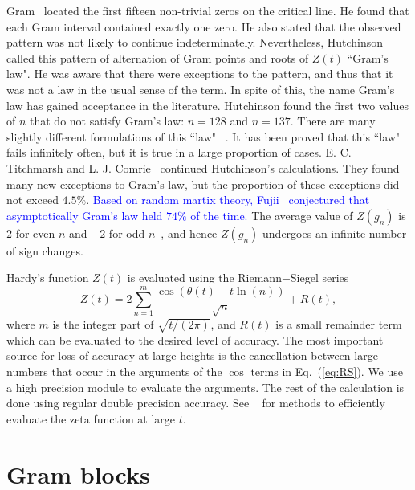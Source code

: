 \documentclass[twoside]{article}
\theoremstyle{definition}
\begin{document}
Gram~\cite{Gram 1903} located the first fifteen non-trivial zeros on the critical line. He found that each Gram interval 
contained exactly one zero. He also stated that the observed pattern was not likely to continue indeterminately. 
Nevertheless, Hutchinson~\cite{Hutchinson 1925} called this pattern of alternation of Gram points and roots of $Z(t)$ ``Gram's law". He was aware that there were exceptions to the pattern, and thus that it was not a law in the usual sense of the term. In spite of this, the name Gram's law has gained acceptance in the literature. Hutchinson found the first two values of $n$ that do not satisfy Gram's
law: $n = 128$ and $n = 137$.
There are many slightly different  formulations of this ``law" ~\cite{Korolev,Trudgian}.
It has been proved that this ``law" fails infinitely often, but it is true in a large proportion of cases. E. C. Titchmarsh and L. J. Comrie~\cite{Titchmarsh 1935,Titchmarsh 1936} continued Hutchinson's calculations. They found many new exceptions
to Gram's law, but the proportion of these exceptions did not exceed $4.5\%$. \textcolor{blue}{Based on random martix theory, Fujii~\cite{Fujii} conjectured that asymptotically Gram's law held $74\%$ of the time.}
The average value of $Z(g_n)$ is $2$ for even $n$ and $-2$ for odd $n$~\cite{Titchmarsh 1986},
and hence $Z(g_n)$ undergoes an infinite number of sign changes.

Hardy's function $Z(t)$  is evaluated using the Riemann$-$Siegel series
\begin{equation}
Z(t) = 2\sum^{m}_{n=1}\frac{\cos(\theta(t) - t \ln (n))}{\sqrt{n}} + R(t), 
\label{eq:RS}
\end{equation}
where $m$ is the integer part of $\sqrt{t/(2\pi)}$, and $R(t)$ is a small remainder
term which can be evaluated to the desired level of accuracy. The most important 
source for loss of accuracy at large heights is the cancellation between
large numbers that occur in the arguments of the $\cos$ terms in Eq.~(\ref{eq:RS}). We 
use a high precision module to evaluate the arguments. The rest of the calculation
is done using regular double precision accuracy. See ~\cite{Odlyzko 1992,hiary,gourdon} for methods to efficiently evaluate the zeta function at large $t$.

\section{\label{sec4}Gram blocks}
\end{document}
